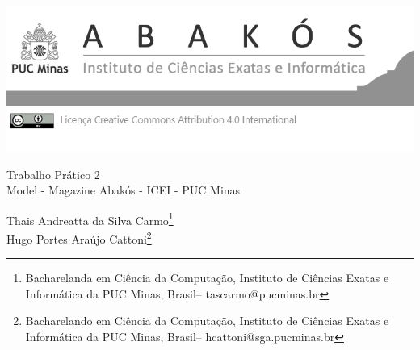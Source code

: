 \documentclass[a4paper,12pt,Times]{article}
\makeatletter
\newcommand{\monog}{Trabalho Prático 2}
\newcommand{\monogES}{Model - Magazine Abakós - ICEI - PUC Minas}
\newcommand{\origem}{Brasil}
\newcommand{\AutorA}{Thais Andreatta da Silva Carmo}
\newcommand{\funcaoA}{Bacharelanda em Ciência da Computação}
\newcommand{\emailA}{tascarmo@pucminas.br}
\newcommand{\cursA}{Instituto de Ciências Exatas e Informática da PUC Minas}
\newcommand{\AutorB}{Hugo Portes Araújo Cattoni}
\newcommand{\funcaoB}{Bacharelando em Ciência da Computação}
\newcommand{\emailB}{hcattoni@sga.pucminas.br}
\newcommand{\cursB}{Instituto de Ciências Exatas e Informática da PUC Minas}
\makeatother
\begin{document}

\begin{flushleft}

\begin{minipage} [c][5cm][b]{16.5cm} %
\includegraphics[scale=1.1]{figuras/pucmg.png} 
\end{minipage}

 \vspace{0cm} {
 \singlespacing \Large{\monog {} \\ }
  \normalsize{\monogES}
 }
\end{flushleft}
\begin{flushright}
\singlespacing 
\normalsize{\AutorA \footnote{\funcaoA, \cursA, \origem -- \emailA }} \\
\normalsize{\AutorB \footnote{\funcaoB, \cursB, \origem -- \emailB }} \\
\end{flushright}
\thispagestyle{empty}
\end{document}
